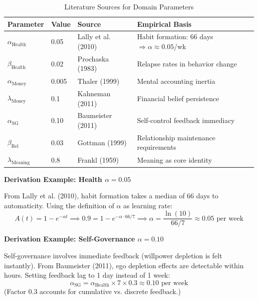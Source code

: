 \begin{table}[htbp]
\centering
\caption{Literature Sources for Domain Parameters}
\label{tab:rrr-literature}
\renewcommand{\arraystretch}{1.2}
\footnotesize
\begin{tabular}{@{}lllp{4.5cm}@{}}
\toprule
\textbf{Parameter} & \textbf{Value} & \textbf{Source} & \textbf{Empirical Basis} \\
\midrule
$\alpha_{\text{Health}}$ & 0.05 & Lally et al. (2010) & Habit formation: 66 days $\Rightarrow \alpha \approx 0.05$/wk \\
$\beta_{\text{Health}}$ & 0.02 & Prochaska (1983) & Relapse rates in behavior change \\
$\alpha_{\text{Money}}$ & 0.005 & Thaler (1999) & Mental accounting inertia \\
$\lambda_{\text{Money}}$ & 0.1 & Kahneman (2011) & Financial belief persistence \\
$\alpha_{\text{SG}}$ & 0.10 & Baumeister (2011) & Self-control feedback immediacy \\
$\beta_{\text{Rel}}$ & 0.03 & Gottman (1999) & Relationship maintenance requirements \\
$\lambda_{\text{Meaning}}$ & 0.8 & Frankl (1959) & Meaning as core identity \\
\bottomrule
\end{tabular}
\end{table}

\textbf{Derivation Example: Health $\alpha = 0.05$}

From Lally et al. (2010), habit formation takes a median of 66 days to automaticity.
Using the definition of $\alpha$ as learning rate:
\begin{equation}
A(t) = 1 - e^{-\alpha t} \implies 0.9 = 1 - e^{-\alpha \cdot 66/7} \implies \alpha = \frac{\ln(10)}{66/7} \approx 0.05 \text{ per week}
\end{equation}

\textbf{Derivation Example: Self-Governance $\alpha = 0.10$}

Self-governance involves immediate feedback (willpower depletion is felt instantly).
From Baumeister (2011), ego depletion effects are detectable within hours.
Setting feedback lag to 1 day instead of 1 week:
\begin{equation}
\alpha_{\text{SG}} = \alpha_{\text{Health}} \times 7 \times 0.3 \approx 0.10 \text{ per week}
\end{equation}
(Factor 0.3 accounts for cumulative vs. discrete feedback.)


